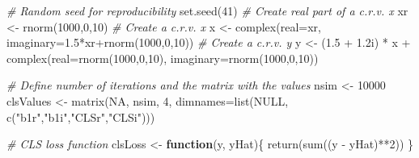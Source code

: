 \documentclass[
]{book}
\newenvironment{Shaded}{\begin{snugshade}}{\end{snugshade}}
\newcommand{\AttributeTok}[1]{\textcolor[rgb]{0.77,0.63,0.00}{#1}}
\newcommand{\CommentTok}[1]{\textcolor[rgb]{0.56,0.35,0.01}{\textit{#1}}}
\newcommand{\ConstantTok}[1]{\textcolor[rgb]{0.00,0.00,0.00}{#1}}
\newcommand{\ControlFlowTok}[1]{\textcolor[rgb]{0.13,0.29,0.53}{\textbf{#1}}}
\newcommand{\DecValTok}[1]{\textcolor[rgb]{0.00,0.00,0.81}{#1}}
\newcommand{\FloatTok}[1]{\textcolor[rgb]{0.00,0.00,0.81}{#1}}
\newcommand{\FunctionTok}[1]{\textcolor[rgb]{0.00,0.00,0.00}{#1}}
\newcommand{\NormalTok}[1]{#1}
\newcommand{\OtherTok}[1]{\textcolor[rgb]{0.56,0.35,0.01}{#1}}
\newcommand{\SpecialCharTok}[1]{\textcolor[rgb]{0.00,0.00,0.00}{#1}}
\newcommand{\StringTok}[1]{\textcolor[rgb]{0.31,0.60,0.02}{#1}}
\begin{document}
\begin{Shaded}
\begin{Highlighting}[]
\CommentTok{\# Random seed for reproducibility}
\FunctionTok{set.seed}\NormalTok{(}\DecValTok{41}\NormalTok{)}
\CommentTok{\# Create real part of a c.r.v. x}
\NormalTok{xr }\OtherTok{\textless{}{-}} \FunctionTok{rnorm}\NormalTok{(}\DecValTok{1000}\NormalTok{,}\DecValTok{0}\NormalTok{,}\DecValTok{10}\NormalTok{)}
\CommentTok{\# Create a c.r.v. x}
\NormalTok{x }\OtherTok{\textless{}{-}} \FunctionTok{complex}\NormalTok{(}\AttributeTok{real=}\NormalTok{xr, }\AttributeTok{imaginary=}\FloatTok{1.5}\SpecialCharTok{*}\NormalTok{xr}\SpecialCharTok{+}\FunctionTok{rnorm}\NormalTok{(}\DecValTok{1000}\NormalTok{,}\DecValTok{0}\NormalTok{,}\DecValTok{10}\NormalTok{))}
\CommentTok{\# Create a c.r.v. y}
\NormalTok{y }\OtherTok{\textless{}{-}}\NormalTok{ (}\FloatTok{1.5} \SpecialCharTok{+} \FloatTok{1.2}\NormalTok{i) }\SpecialCharTok{*}\NormalTok{ x }\SpecialCharTok{+}
    \FunctionTok{complex}\NormalTok{(}\AttributeTok{real=}\FunctionTok{rnorm}\NormalTok{(}\DecValTok{1000}\NormalTok{,}\DecValTok{0}\NormalTok{,}\DecValTok{10}\NormalTok{), }\AttributeTok{imaginary=}\FunctionTok{rnorm}\NormalTok{(}\DecValTok{1000}\NormalTok{,}\DecValTok{0}\NormalTok{,}\DecValTok{10}\NormalTok{))}

\CommentTok{\# Define number of iterations and the matrix with the values}
\NormalTok{nsim }\OtherTok{\textless{}{-}} \DecValTok{10000}
\NormalTok{clsValues }\OtherTok{\textless{}{-}} \FunctionTok{matrix}\NormalTok{(}\ConstantTok{NA}\NormalTok{, nsim, }\DecValTok{4}\NormalTok{,}
                    \AttributeTok{dimnames=}\FunctionTok{list}\NormalTok{(}\ConstantTok{NULL}\NormalTok{,}
                                  \FunctionTok{c}\NormalTok{(}\StringTok{"b1r"}\NormalTok{,}\StringTok{"b1i"}\NormalTok{,}\StringTok{"CLSr"}\NormalTok{,}\StringTok{"CLSi"}\NormalTok{)))}

\CommentTok{\# CLS loss function}
\NormalTok{clsLoss }\OtherTok{\textless{}{-}} \ControlFlowTok{function}\NormalTok{(y, yHat)\{}
    \FunctionTok{return}\NormalTok{(}\FunctionTok{sum}\NormalTok{((y }\SpecialCharTok{{-}}\NormalTok{ yHat)}\SpecialCharTok{**}\DecValTok{2}\NormalTok{))}
\NormalTok{\}}


\end{Highlighting}
\end{Shaded}
\end{document}
